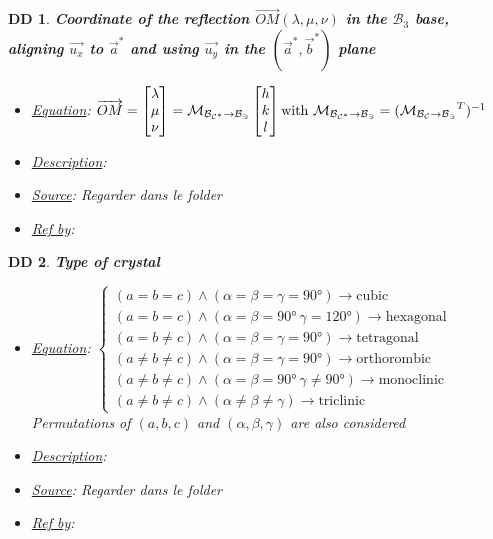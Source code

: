 \documentclass[12pt]{article}
\newtheorem{DD}{DD}
\begin{document}
\begin{DD}
\label{DD_2}
\noindent\colorbox{shadecolorDD}{\normalfont \textbf{Coordinate of the reflection $ \overrightarrow{OM}(\lambda,\mu,\nu)$ in the $\mathcal{B}_3$ base, \\ aligning $\vec{u_x}$ to $\vec{a}^{*}$ and using $\vec{u_y}$ in the $(\vec{a}^{*}, \vec{b}^{*})$ plane}}
\normalfont
\begin{itemize}
\item \underline{Equation}:  $ \overrightarrow{OM} = 
\begin{bmatrix}
\lambda \\
\mu \\
\nu 
\end{bmatrix} =  \mathcal{M_{\mathcal{B}_{C^{*}}\rightarrow \mathcal{B}_3}} 
\begin{bmatrix}
h \\
k \\
l 
\end{bmatrix} \\ 
\text{with} \ \mathcal{M_{\mathcal{B}_{C^{*}}\rightarrow \mathcal{B}_3}}  = 
(\mathcal{M_{\mathcal{B}_{C}\rightarrow \mathcal{B}_3}}^{T})^{-1} $
\item \underline{Description}: 
\item \underline{Source}: Regarder dans le folder
\item \underline{Ref by}: 
\end{itemize}
\end{DD}

\begin{DD}
\label{DD_3}
\noindent\colorbox{shadecolorDD}{\normalfont \textbf{Type of crystal}}
\normalfont
\begin{itemize}
\item \underline{Equation}:  $
\begin{cases}
(a=b=c) \wedge (\alpha=\beta=\gamma = \ang{90}) \rightarrow \text{cubic}\\
(a=b=c) \wedge (\alpha=\beta=\ang{90} \ \gamma = \ang{120}) \rightarrow \text{hexagonal} \\
(a=b\neq c) \wedge (\alpha=\beta=\gamma = \ang{90}) \rightarrow \text{tetragonal}\\
(a\neq b\neq c) \wedge (\alpha=\beta=\gamma = \ang{90}) \rightarrow \text{orthorombic}\\
(a\neq b\neq c) \wedge (\alpha=\beta=\ang{90} \ \gamma \neq \ang{90}) \rightarrow \text{monoclinic}\\
(a\neq b\neq c) \wedge (\alpha\neq\beta\neq\gamma)  \rightarrow \text{triclinic}
\end{cases}$ \\
Permutations of $(a,b,c)$ and $(\alpha, \beta, \gamma)$ are also considered 
\item \underline{Description}: 
\item \underline{Source}: Regarder dans le folder
\item \underline{Ref by}: 
\end{itemize}
\end{DD}
\end{document}
